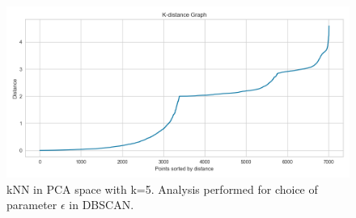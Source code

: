 \documentclass[a4paper,11pt]{article}
\begin{document}
\begin{figure}
    \centering
    \includegraphics[width=\linewidth]{figures/clustering/dbscan_k_distance.png}
    \caption{kNN in PCA space with k=5. Analysis performed for choice of parameter $\epsilon$ in DBSCAN. }
    \label{fig:kNN_PCA}
\end{figure}
\end{document}

